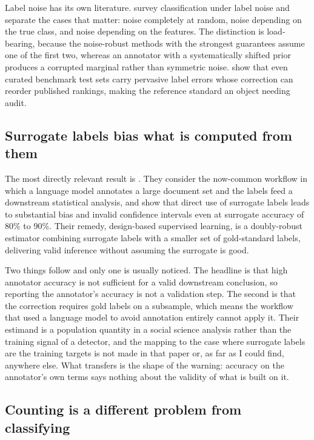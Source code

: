 Label noise has its own literature. \citet{frenay2014labelnoise} survey classification under
label noise and separate the cases that matter: noise completely at random, noise depending
on the true class, and noise depending on the features. The distinction is load-bearing,
because the noise-robust methods with the strongest guarantees assume one of the first two,
whereas an annotator with a systematically shifted prior produces a corrupted marginal rather
than symmetric noise. \citet{northcutt2021labelerrors} show that even curated benchmark test
sets carry pervasive label errors whose correction can reorder published rankings, making the
reference standard an object needing audit.

\subsection{Surrogate labels bias what is computed from them}

The most directly relevant result is \citet{egami2023surrogates}. They consider the
now-common workflow in which a language model annotates a large document set and the labels
feed a downstream statistical analysis, and show that direct use of surrogate labels leads to
substantial bias and invalid confidence intervals even at surrogate accuracy of 80\% to 90\%.
Their remedy, design-based supervised learning, is a doubly-robust estimator combining
surrogate labels with a smaller set of gold-standard labels, delivering valid inference
without assuming the surrogate is good.

Two things follow and only one is usually noticed. The headline is that high annotator
accuracy is not sufficient for a valid downstream conclusion, so reporting the annotator's
accuracy is not a validation step. The second is that the correction requires gold labels on
a subsample, which means the workflow that used a language model to avoid annotation entirely
cannot apply it. Their estimand is a population quantity in a social science analysis rather
than the training signal of a detector, and the mapping to the case where surrogate labels
are the training targets is not made in that paper or, as far as I could find, anywhere else.
What transfers is the shape of the warning: accuracy on the annotator's own terms says
nothing about the validity of what is built on it.

\subsection{Counting is a different problem from classifying}

